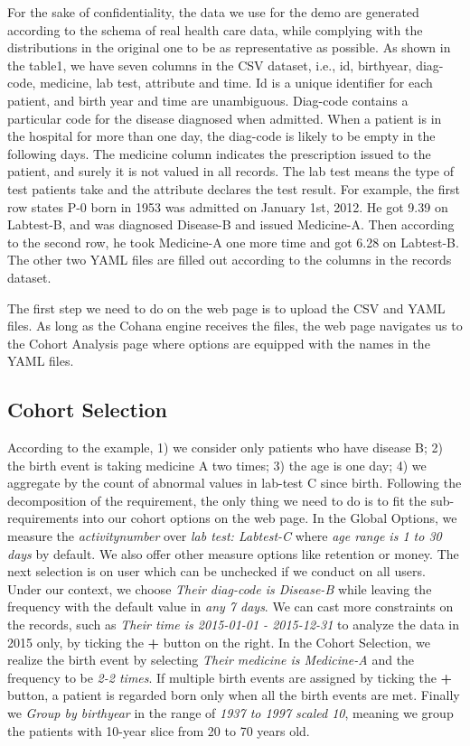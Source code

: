 \documentclass[10pt,conference,letterpaper]{IEEEtran}
\begin{document}
For the sake of confidentiality, the data we use for the demo are generated according to the schema of real health care data, while complying with the distributions in the original one to be as representative as possible. As shown in the table1, we have seven columns in the CSV dataset, i.e., id, birthyear, diag-code, medicine, lab test, attribute and time. Id is a unique identifier for each patient, and birth year and time are unambiguous. Diag-code contains a particular code for the disease diagnosed when admitted. When a patient is in the hospital for more than one day, the diag-code is likely to be empty in the following days. The medicine column indicates the prescription issued to the patient, and surely it is not valued in all records. The lab test means the type of test patients take and the attribute declares the test result. For example, the first row states P-0 born in 1953 was admitted on January 1st, 2012. He got 9.39 on Labtest-B, and was diagnosed Disease-B and issued Medicine-A. Then according to the second row, he took Medicine-A one more time and got 6.28 on Labtest-B. The other two YAML files are filled out according to the columns in the records dataset.

The first step we need to do on the web page is to upload the CSV and YAML files. As long as the Cohana engine receives the files, the web page navigates us to the Cohort Analysis page where options are equipped with the names in the YAML files.

\subsection{Cohort Selection}

According to the example, 1) we consider only patients who have disease B; 2) the birth event is taking medicine A two times; 3) the age is one day; 4) we aggregate by the count of abnormal values in lab-test C since birth. Following the decomposition of the requirement, the only thing we need to do is to fit the sub-requirements into our cohort options on the web page. In the Global Options, we measure the \emph{activity\textunderscore number} over \emph{lab test: Labtest-C} where \emph{age range is 1 to 30 days} by default. We also offer other measure options like retention or money. The next selection is on user which can be unchecked if we conduct on all users. Under our context, we choose \emph{Their diag-code is Disease-B} while leaving the frequency with the default value in \emph{any 7 days}. We can cast more constraints on the records, such as \emph{Their time is 2015-01-01 - 2015-12-31} to analyze the data in 2015 only, by ticking the \textbf{+} button on the right. In the Cohort Selection, we realize the birth event by selecting \emph{Their medicine is Medicine-A} and the frequency to be \emph{2-2 times}. If multiple birth events are assigned by ticking the \textbf{+} button, a patient is regarded born only when all the birth events are met. Finally we \emph{Group by birthyear} in the range of \emph{1937 to 1997 scaled 10}, meaning we group the patients with 10-year slice from 20 to 70 years old.
\end{document}
